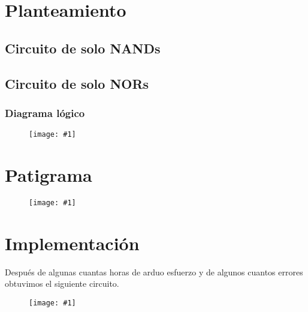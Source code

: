\documentclass{mylib/reporte}
\newcommand{\insertImage}[2]{
	\begin{figure}[H]
		\centering
		\texttt{[image: \#1]}
	\end{figure}
}
\begin{document}
\section{Planteamiento}

\subsection{Circuito de solo NANDs}
\subsection{Circuito de solo NORs}

\subsubsection{Diagrama lógico}

\insertImage{img/dise_proy2/compLog}{10}

\section{Patigrama}

\insertImage{img/dise_proy2/patigrama}{11}

\section{Implementación}

Después de algunas cuantas horas de arduo esfuerzo y de algunos cuantos errores obtuvimos el siguiente circuito.

\insertImage{img/dise_proy2/implementacion}{15}
\end{document}
